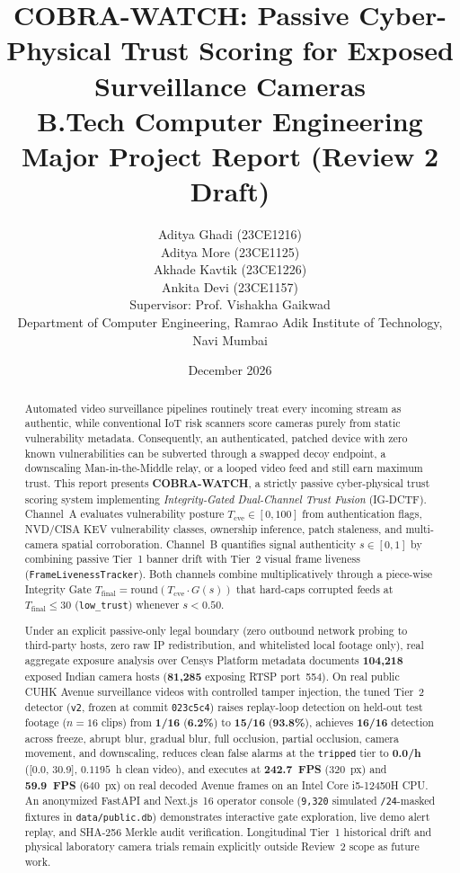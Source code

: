 \documentclass[12pt,a4paper]{article}
\title{\textbf{COBRA-WATCH: Passive Cyber-Physical Trust Scoring for Exposed Surveillance Cameras}\\[0.5em]
\large B.Tech Computer Engineering Major Project Report (Review 2 Draft)}
\author{Aditya Ghadi (23CE1216)\\
Aditya More (23CE1125)\\
Akhade Kavtik (23CE1226)\\
Ankita Devi (23CE1157)\\[0.6em]
\small Supervisor: Prof. Vishakha Gaikwad\\
\small Department of Computer Engineering, Ramrao Adik Institute of Technology, Navi Mumbai}
\date{December 2026}
\begin{document}
\maketitle

\begin{abstract}
Automated video surveillance pipelines routinely treat every incoming stream as authentic, while conventional IoT risk scanners score cameras purely from static vulnerability metadata. Consequently, an authenticated, patched device with zero known vulnerabilities can be subverted through a swapped decoy endpoint, a downscaling Man-in-the-Middle relay, or a looped video feed and still earn maximum trust. This report presents \textbf{COBRA-WATCH}, a strictly passive cyber-physical trust scoring system implementing \emph{Integrity-Gated Dual-Channel Trust Fusion} (IG-DCTF). Channel~A evaluates vulnerability posture $T_{\mathrm{cve}} \in [0, 100]$ from authentication flags, NVD/CISA KEV vulnerability classes, ownership inference, patch staleness, and multi-camera spatial corroboration. Channel~B quantifies signal authenticity $s \in [0, 1]$ by combining passive Tier~1 banner drift with Tier~2 visual frame liveness (\texttt{FrameLivenessTracker}). Both channels combine multiplicatively through a piece-wise Integrity Gate $T_{\mathrm{final}} = \mathrm{round}(T_{\mathrm{cve}} \cdot G(s))$ that hard-caps corrupted feeds at $T_{\mathrm{final}} \le 30$ (\texttt{low\_trust}) whenever $s < 0.50$.

Under an explicit passive-only legal boundary (zero outbound network probing to third-party hosts, zero raw IP redistribution, and whitelisted local footage only), real aggregate exposure analysis over Censys Platform metadata documents \textbf{104,218} exposed Indian camera hosts (\textbf{81,285} exposing RTSP port~554). On real public CUHK Avenue surveillance videos with controlled tamper injection, the tuned Tier~2 detector (\texttt{v2}, frozen at commit \texttt{023c5c4}) raises replay-loop detection on held-out test footage ($n = 16$ clips) from \textbf{1/16} (\textbf{6.2\%}) to \textbf{15/16} (\textbf{93.8\%}), achieves \textbf{16/16} detection across freeze, abrupt blur, gradual blur, full occlusion, partial occlusion, camera movement, and downscaling, reduces clean false alarms at the \texttt{tripped} tier to \textbf{0.0/h} ([0.0, 30.9], $0.1195$~h clean video), and executes at \textbf{242.7~FPS} ($320$~px) and \textbf{59.9~FPS} ($640$~px) on real decoded Avenue frames on an Intel Core i5-12450H CPU. An anonymized FastAPI and Next.js~16 operator console (\texttt{9,320} simulated \texttt{/24}-masked fixtures in \texttt{data/public.db}) demonstrates interactive gate exploration, live demo alert replay, and SHA-256 Merkle audit verification. Longitudinal Tier~1 historical drift and physical laboratory camera trials remain explicitly outside Review~2 scope as future work.
\end{abstract}
\end{document}
